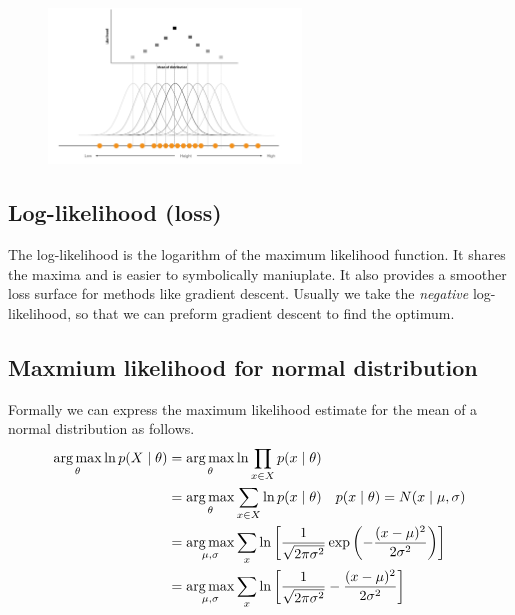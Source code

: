 \documentclass[12pt]{article}
\begin{document}
\begin{figure}[!h]
    \centering
    \includegraphics[width=0.6\textwidth]{assets/maximumlikeli.png}
\end{figure}

\subsection{Log-likelihood (loss)}

\begin{definition}
    The log-likelihood is the logarithm of the maximum likelihood function. It shares the maxima and is easier to symbolically maniuplate. It also provides a smoother loss surface for methods like gradient descent. Usually we take the \textit{negative} log-likelihood, so that we can preform gradient descent to find the optimum.
\end{definition}


\subsection{Maxmium likelihood for normal distribution}

Formally we can express the maximum likelihood estimate for the mean of a normal distribution as follows.
\begin{align*}
    \operatorname*{arg\, max}_{\theta} \ln p(X\mid \theta) & = \operatorname*{arg\, max}_{\theta} \ln \prod_{x\in X} p(x\mid \theta) \\
    & = \operatorname*{arg\, max}_{\theta} \sum_{x\in X} \ln p(x\mid \theta) \quad p(x\mid \theta) = N(x\mid \mu, \sigma) \\
    & = \operatorname*{arg\, max}_{\mu, \sigma} \sum_{x} \ln\left[  \frac{1}{\sqrt{2\pi\sigma^2}} \exp\left(-\frac{(x-\mu)^2}{2\sigma^2}\right) \right]\\
    & = \operatorname*{arg\, max}_{\mu, \sigma} \sum_{x} \ln \left[ \frac{1}{\sqrt{2\pi\sigma^2}} -\frac{(x-\mu)^2}{2\sigma^2}\right]\\
\end{align*}
\end{document}
